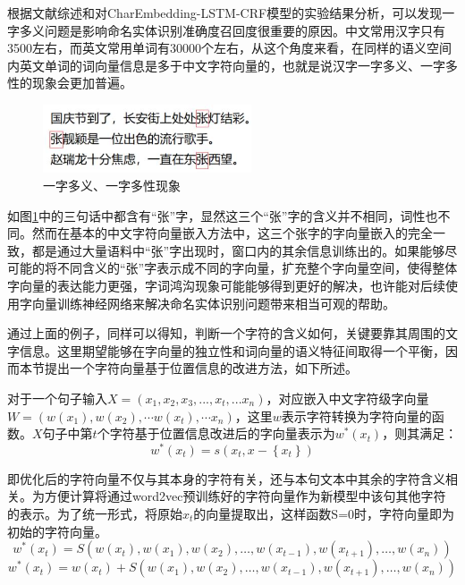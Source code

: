 \documentclass[winfonts,master,oneside,nobackinfo]{njuthesis}
\begin{document}
根据文献综述和对CharEmbedding-LSTM-CRF模型的实验结果分析，可以发现一字多义问题是影响命名实体识别准确度召回度很重要的原因。中文常用汉字只有3500左右，而英文常用单词有30000个左右，从这个角度来看，在同样的语义空间内英文单词的词向量信息是多于中文字符向量的，也就是说汉字一字多义、一字多性的现象会更加普遍。

\begin{figure}[ht]
\centering
\includegraphics[width=0.55\textwidth]{./figure/一字多义.jpg}
\caption{一字多义、一字多性现象}
\label{one2many}
\end{figure}

如图\ref{one2many}中的三句话中都含有“张”字，显然这三个“张”字的含义并不相同，词性也不同。然而在基本的中文字符向量嵌入方法中，这三个张字的字向量嵌入的完全一致，都是通过大量语料中“张”字出现时，窗口内的其余信息训练出的。如果能够尽可能的将不同含义的“张”字表示成不同的字向量，扩充整个字向量空间，使得整体字向量的表达能力更强，字词鸿沟现象可能能够得到更好的解决，也许能对后续使用字向量训练神经网络来解决命名实体识别问题带来相当可观的帮助。

通过上面的例子，同样可以得知，判断一个字符的含义如何，关键要靠其周围的文字信息。这里期望能够在字向量的独立性和词向量的语义特征间取得一个平衡，因而本节提出一个字符向量基于位置信息的改进方法，如下所述。

对于一个句子输入$X=\left(x_{1}, x_{2}, x_{3},...,x_{t},... x_{n}\right)$，对应嵌入中文字符级字向量$W=\left(w\left(x_{1}\right), w\left(x_{2}\right), \cdots w\left(x_{t}\right), \cdots x_{n}\right)$，这里$w$表示字符转换为字符向量的函数。$X$句子中第$t$个字符基于位置信息改进后的字向量表示为$w^{*}(x_{t})$，则其满足：
\begin{equation}
w^{*}\left(x_{t}\right)=s\left(x_{t}, x-\left\{x_{t}\right\}\right)
\end{equation}

即优化后的字符向量不仅与其本身的字符有关，还与本句文本中其余的字符含义相关。为方便计算将通过word2vec预训练好的字符向量作为新模型中该句其他字符的表示。为了统一形式，将原始$x_{t}$的向量提取出，这样函数S=0时，字符向量即为初始的字符向量。
\begin{equation}
w^{*}\left(x_{t}\right)=S\left(w\left(x_{t}\right), w\left(x_{1}\right), w\left(x_{2}\right), \ldots, w\left(x_{t-1}\right), w\left(x_{t+1}\right), \ldots, w\left(x_{n}\right)\right)
\end{equation}
\begin{equation}
w^{*}\left(x_{t}\right)=w\left(x_{t}\right)+S\left( w\left(x_{1}\right), w\left(x_{2}\right), \ldots, w\left(x_{t-1}\right), w\left(x_{t+1}\right), \ldots, w\left(x_{n}\right)\right)
\end{equation}
\end{document}
